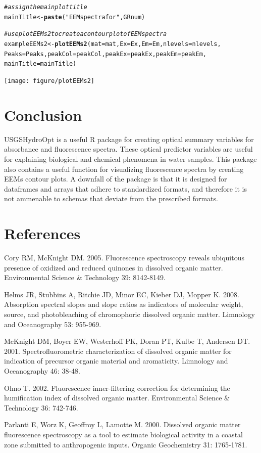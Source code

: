 \documentclass[a4paper,11pt]{article}\usepackage[]{graphicx}\usepackage[]{color}
\makeatletter
\newcommand{\hlstr}[1]{\textcolor[rgb]{0.192,0.494,0.8}{#1}}%
\newcommand{\hlcom}[1]{\textcolor[rgb]{0.678,0.584,0.686}{\textit{#1}}}%
\newcommand{\hlstd}[1]{\textcolor[rgb]{0.345,0.345,0.345}{#1}}%
\newcommand{\hlkwb}[1]{\textcolor[rgb]{0.69,0.353,0.396}{#1}}%
\newcommand{\hlkwc}[1]{\textcolor[rgb]{0.333,0.667,0.333}{#1}}%
\newcommand{\hlkwd}[1]{\textcolor[rgb]{0.737,0.353,0.396}{\textbf{#1}}}%
\newenvironment{kframe}{%
 \def\at@end@of@kframe{}%
 \ifinner\ifhmode%
  \def\at@end@of@kframe{\end{minipage}}%
  \begin{minipage}{\columnwidth}%
 \fi\fi%
 \def\FrameCommand##1{\hskip\@totalleftmargin \hskip-\fboxsep
 \colorbox{shadecolor}{##1}\hskip-\fboxsep
     \hskip-\linewidth \hskip-\@totalleftmargin \hskip\columnwidth}%
 \MakeFramed {\advance\hsize-\width
   \@totalleftmargin\z@ \linewidth\hsize
   \@setminipage}}%
 {\par\unskip\endMakeFramed%
 \at@end@of@kframe}
\newenvironment{knitrout}{}{} %
\makeatother
\begin{document}
\begin{knitrout}
\begin{kframe}
\begin{alltt}
\hlcom{# assign the main plot title}
\hlstd{mainTitle} \hlkwb{<-} \hlkwd{paste}\hlstd{(}\hlstr{"EEM spectra for"}\hlstd{, GRnum)}

\hlcom{# use plotEEMs2 to create a contour plot of EEM spectra}
\hlstd{exampleEEMs2} \hlkwb{<-} \hlkwd{plotEEMs2}\hlstd{(}\hlkwc{mat} \hlstd{= mat,} \hlkwc{Ex} \hlstd{= Ex,} \hlkwc{Em} \hlstd{= Em,} \hlkwc{nlevels} \hlstd{= nlevels,}
    \hlkwc{Peaks} \hlstd{= Peaks,} \hlkwc{peakCol} \hlstd{= peakCol,} \hlkwc{peakEx} \hlstd{= peakEx,} \hlkwc{peakEm} \hlstd{= peakEm,}
    \hlkwc{mainTitle} \hlstd{= mainTitle)}
\end{alltt}
\end{kframe}
\texttt{[image: figure/plotEEMs2]} 

\end{knitrout}


\section{Conclusion}
USGSHydroOpt is a useful R package for creating optical summary variables for absorbance and fluorescence spectra. These optical predictor variables are useful for explaining biological and chemical phenomena in water samples. This package also contains a useful function for visualizing fluorescence spectra by creating EEMs contour plots. A downfall of the package is that it is designed for dataframes and arrays that adhere to standardized formats, and therefore it is not ammenable to schemas that deviate from the prescribed formats.


\section{References}
Cory RM, McKnight DM. 2005. Fluorescence spectroscopy reveals ubiquitous presence of oxidized and reduced quinones in dissolved organic matter. Environmental Science \& Technology 39: 8142-8149.

Helms JR, Stubbins A, Ritchie JD, Minor EC, Kieber DJ, Mopper K. 2008. Absorption spectral slopes and slope ratios as indicators of molecular weight, source, and photobleaching of chromophoric dissolved organic matter. Limnology and Oceanography 53: 955-969.

McKnight DM, Boyer EW, Westerhoff PK, Doran PT, Kulbe T, Andersen DT. 2001. Spectrofluorometric characterization of dissolved organic matter for indication of precursor organic material and aromaticity. Limnology and Oceanography 46: 38-48.

Ohno T. 2002. Fluorescence inner-filtering correction for determining the humification index of dissolved organic matter. Environmental Science \& Technology 36: 742-746.

Parlanti E, Worz K, Geoffroy L, Lamotte M. 2000. Dissolved organic matter fluorescence spectroscopy as a tool to estimate biological activity in a coastal zone submitted to anthropogenic inputs. Organic Geochemistry 31: 1765-1781.
\end{document}
